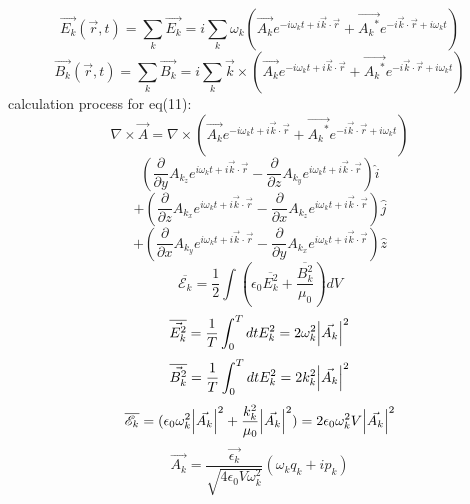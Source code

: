 \documentclass[9pt]{article}
\begin{document}
\begin{equation}
    \vec{E_k}(\vec{r},t)=\sum_k\vec{E_k}=i\sum_k\omega_k(\vec{A_k}e^{-i\omega_k t + i\vec{k}\cdot\vec{r}}+
    \vec{{A_k}^*}e^{-i\vec{k}\cdot\vec{r} + i\omega_k t})
\end{equation}
\begin{equation}
    \vec{B_k}(\vec{r},t)=\sum_k\vec{B_k}=i\sum_k\vec{k}\times(\vec{A_k}e^{-i\omega_k t + i\vec{k}\cdot\vec{r}}+
    \vec{{A_k}^*}e^{-i\vec{k}\cdot\vec{r} + i\omega_k t})
\end{equation}
calculation process for eq(11):
\begin{equation*}
    \nabla\times\vec{A}=\nabla\times(\vec{A_k}e^{-i\omega_k t + i\vec{k}\cdot\vec{r}}+
    \vec{{A_k}^*}e^{-i\vec{k}\cdot\vec{r} + i\omega_k t})
\end{equation*}
\begin{equation*}
    (\frac{\partial}{\partial{y}}A_{k_z}e^{i\omega_k t + i\vec{k}\cdot\vec{r}}-
    \frac{\partial}{\partial{z}}A_{k_y}e^{i\omega_k t + i\vec{k}\cdot\vec{r}})\hat{i}
\end{equation*}
\begin{equation*}
    + (\frac{\partial}{\partial{z}}A_{k_x}e^{i\omega_k t + i\vec{k}\cdot\vec{r}}-
    \frac{\partial}{\partial{x}}A_{k_z}e^{i\omega_k t + i\vec{k}\cdot\vec{r}})\hat{j}
\end{equation*}
\begin{equation*}
    + (\frac{\partial}{\partial{x}}A_{k_y}e^{i\omega_k t + i\vec{k}\cdot\vec{r}}-
    \frac{\partial}{\partial{y}}A_{k_x}e^{i\omega_k t + i\vec{k}\cdot\vec{r}})\hat{z}
\end{equation*}
\begin{equation}
    \overline{\mathscr{E}_k}=\frac{1}{2}\int(\epsilon_0 \overline{E^2_k}+\frac{\overline{B^2_k}}{\mu_0})dV
\end{equation}
\begin{equation}
    \overline{\vec{E^2_k}}=\frac{1}{T}\int^T_0 dt E^2_k = 2\omega^2_k \abs{\vec{A_k}}^2
\end{equation}
\begin{equation}
    \overline{\vec{B^2_k}}=\frac{1}{T}\int^T_0 dt E^2_k = 2k^2_k \abs{\vec{A_k}}^2
\end{equation}
\begin{equation}
    \overline{\mathscr{E}_k}=(\epsilon_0\omega^2_k \abs{\vec{A_k}}^2 + \frac{k^2_k}{\mu_0} \abs{\vec{A_k}}^2)
    =2\epsilon_0\omega^2_k V \abs{\vec{A_k}}^2
\end{equation}
\begin{equation}
    \vec{A_k}=\frac{\vec{\epsilon_k}}{\sqrt{4\epsilon_0 V \omega^2_k}}(\omega_k q_k + ip_k)
\end{equation}
\end{document}

